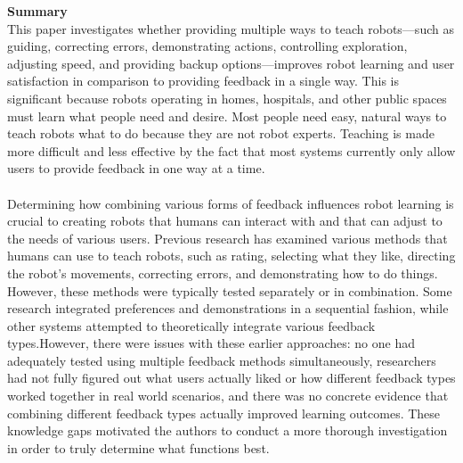 \documentclass[report.tex]{subfiles}
\begin{document}
\noindent\textbf{Summary} \\
This paper investigates whether providing multiple ways to teach robots—such as guiding, correcting errors, demonstrating actions, controlling exploration, adjusting speed, and providing backup options—improves robot learning and user satisfaction in comparison to providing feedback in a single way. This is significant because robots operating in homes, hospitals, and other public spaces must learn what people need and desire. Most people need easy, natural ways to teach robots what to do because they are not robot experts. Teaching is made more difficult and less effective by the fact that most systems currently only allow users to provide feedback in one way at a time.\\\\ Determining how combining various forms of feedback influences robot learning is crucial to creating robots that humans can interact with and that can adjust to the needs of various users.
Previous research has examined various methods that humans can use to teach robots, such as rating, selecting what they like, directing the robot's movements, correcting errors, and demonstrating how to do things. However, these methods were typically tested separately or in combination. Some research integrated preferences and demonstrations in a sequential fashion, while other systems attempted to theoretically integrate various feedback types.However, there were issues with these earlier approaches: no one had adequately tested using multiple feedback methods simultaneously, researchers had not fully figured out what users actually liked or how different feedback types worked together in real world scenarios, and there was no concrete evidence that combining different feedback types actually improved learning outcomes. These knowledge gaps motivated the authors to conduct a more thorough investigation in order to truly determine what functions best.
\end{document}
